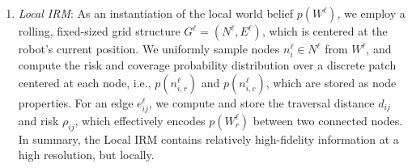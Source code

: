 \documentclass[letterpaper]{article} %
\begin{document}
\begin{enumerate}[label={\arabic*)}]
  \itemsep0em 
  \setlength{\itemsep}{0.2em}
  \item \textit{Local IRM}: 
As an instantiation of the local world belief $p(W^\ell)$, we employ a rolling, fixed-sized grid structure $G^\ell=(N^\ell, E^\ell)$, which is centered at the robot's current position.
We uniformly sample nodes $n^\ell_i \in N^\ell$ from $W^\ell$,
and compute the risk and coverage probability distribution over a discrete patch centered at each node, i.e.,
$p(n^\ell_{i,r})$ and $p(n^\ell_{i,c})$, which are stored as node properties. 
For an edge $e^\ell_{ij}$, we compute and store the traversal distance $d_{ij}$ and risk $\rho_{ij}$,
which effectively encodes $p(W^\ell_{r})$ between two connected nodes.
In summary, the Local IRM contains relatively high-fidelity information at a high resolution, but locally.


\end{enumerate}
\end{document}

